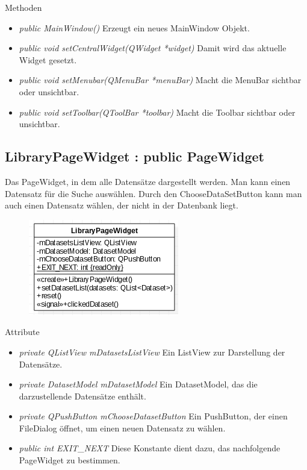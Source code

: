Methoden
\begin{itemize}
	\item\textit{public MainWindow()} 
	Erzeugt ein neues MainWindow Objekt.
	\item\textit{public void setCentralWidget(QWidget *widget)} 
	Damit wird das aktuelle Widget gesetzt.
	\item\textit{public void setMenubar(QMenuBar *menuBar)} 
	Macht die MenuBar sichtbar oder unsichtbar.
	\item\textit{public void setToolbar(QToolBar *toolbar)} 
	Macht die Toolbar sichtbar oder unsichtbar.
\end{itemize}

\subsection*{LibraryPageWidget : public PageWidget}
Das PageWidget, in dem alle Datensätze dargestellt werden. Man kann einen Datensatz für die Suche auswählen. Durch den ChooseDataSetButton kann man auch einen Datensatz wählen, der nicht in der Datenbank liegt. 

\begin{figure}[H]
	\centering
	\includegraphics[scale=0.5]{img/Klassendiagramm/Klassen/View/LibraryPageWidget}
	\label{fig:libraryPageWidget}
\end{figure}

Attribute
\begin{itemize}
	\item\textit{private QListView mDatasetsListView} 
	Ein ListView zur Darstellung der Datensätze.
	\item\textit{private DatasetModel mDatasetModel}
	Ein DatasetModel, das die darzustellende Datensätze enthält.
	\item\textit{private QPushButton mChooseDatasetButton} 
	Ein PushButton, der einen FileDialog öffnet, um einen neuen Datensatz zu wählen.
	\item\textit{public int EXIT\_NEXT}
	Diese Konstante dient dazu, das nachfolgende PageWidget zu bestimmen.
\end{itemize}


